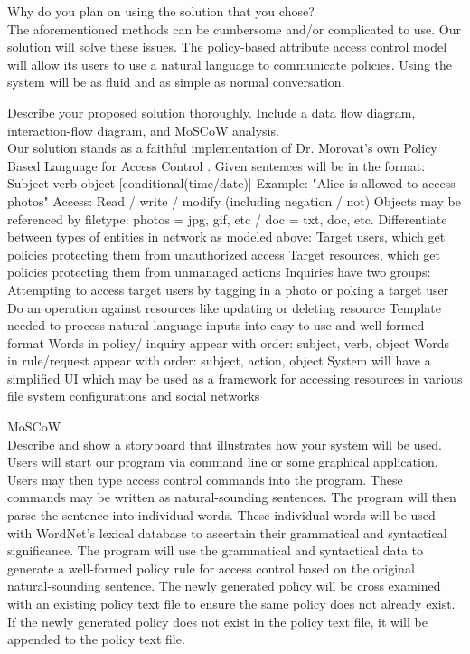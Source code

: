 \documentclass[12pt]{article}
\begin{document}
Why do you plan on using the solution that you chose? \\
The aforementioned methods can be cumbersome and/or complicated to use. Our solution will solve these issues. The policy-based attribute access control model will allow its users to use a natural language to communicate policies. Using the system will be as fluid and as simple as normal conversation. 

Describe your proposed solution thoroughly. Include a data flow diagram, interaction-flow diagram, and MoSCoW analysis. \\
Our solution stands as a faithful implementation of Dr. Morovat's own Policy Based Language for Access Control \cite{morovat16}.
Given sentences will be in the format: Subject verb object [conditional(time/date)]
Example: "Alice is allowed to access photos"
Access: Read / write / modify (including negation / not)
Objects may be referenced by filetype: photos = jpg, gif, etc / doc = txt, doc, etc.
Differentiate between types of entities in network as modeled above:
Target users, which get policies protecting them from unauthorized access
Target resources, which get policies protecting them from unmanaged actions
Inquiries have two groups:
Attempting to access target users by tagging in a photo or poking a target user
Do an operation against resources like updating or deleting resource
Template needed to process natural language inputs into easy-to-use and well-formed format
Words in policy/ inquiry appear with order: subject, verb, object
Words in rule/request appear with order: subject, action, object
System will have a simplified UI which may be used as a framework for accessing resources in various file system configurations and social networks

MoSCoW \\

Describe and show a storyboard that illustrates how your system will be used. \\
Users will start our program via command line or some graphical application. Users may then type access control commands into the program. These commands may be written as natural-sounding sentences. The program will then parse the sentence into individual words. These individual words will be used with WordNet’s lexical database to ascertain their grammatical and syntactical significance. The program will use the grammatical and syntactical data to generate a well-formed policy rule for access control based on the original natural-sounding sentence. The newly generated policy will be cross examined with an existing policy text file to ensure the same policy does not already exist. If the newly generated policy does not exist in the policy text file, it will be appended to the policy text file.
\end{document}

